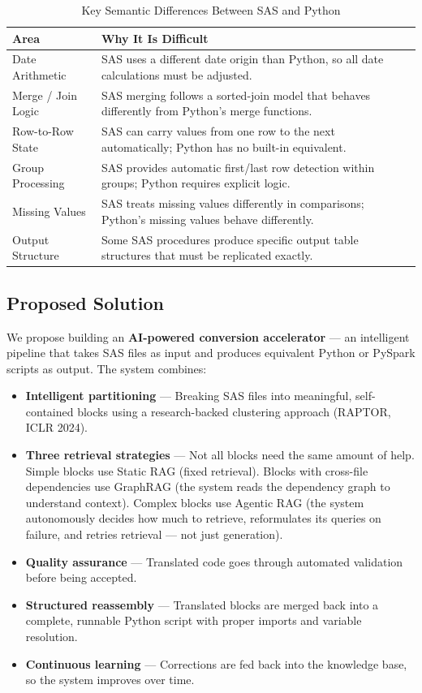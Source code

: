 \documentclass[11pt,a4paper]{article}
\begin{document}
\begin{table}[H]
\centering
\caption{Key Semantic Differences Between SAS and Python}
\renewcommand{\arraystretch}{1.3}
\begin{tabularx}{\textwidth}{@{} l X @{}}
\toprule
\textbf{Area} & \textbf{Why It Is Difficult} \\
\midrule
Date Arithmetic & SAS uses a different date origin than Python, so all date calculations must be adjusted. \\
Merge / Join Logic & SAS merging follows a sorted-join model that behaves differently from Python's merge functions. \\
Row-to-Row State & SAS can carry values from one row to the next automatically; Python has no built-in equivalent. \\
Group Processing & SAS provides automatic first/last row detection within groups; Python requires explicit logic. \\
Missing Values & SAS treats missing values differently in comparisons; Python's missing values behave differently. \\
Output Structure & Some SAS procedures produce specific output table structures that must be replicated exactly. \\
\bottomrule
\end{tabularx}
\end{table}

\subsection{Proposed Solution}

We propose building an \textbf{AI-powered conversion accelerator} — an intelligent pipeline that takes SAS files as input and produces equivalent Python or PySpark scripts as output. The system combines:

\begin{itemize}[leftmargin=1.5em]
    \item \textbf{Intelligent partitioning} — Breaking SAS files into meaningful, self-contained blocks using a research-backed clustering approach (RAPTOR, ICLR 2024).
    \item \textbf{Three retrieval strategies} — Not all blocks need the same amount of help. Simple blocks use Static RAG (fixed retrieval). Blocks with cross-file dependencies use GraphRAG (the system reads the dependency graph to understand context). Complex blocks use Agentic RAG (the system autonomously decides how much to retrieve, reformulates its queries on failure, and retries retrieval — not just generation).
    \item \textbf{Quality assurance} — Translated code goes through automated validation before being accepted.
    \item \textbf{Structured reassembly} — Translated blocks are merged back into a complete, runnable Python script with proper imports and variable resolution.
    \item \textbf{Continuous learning} — Corrections are fed back into the knowledge base, so the system improves over time.
\end{itemize}
\end{document}
